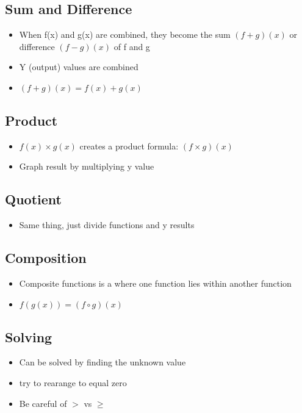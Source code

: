 \documentclass{article}
\begin{document}
    \subsection{Sum and Difference}
    \begin{itemize}
        \item When f(x) and g(x) are combined, they become the sum $(f+g)(x)$ or difference $(f-g)(x)$ of f and g
        \item Y (output) values are combined
        \item $(f + g)(x) = f(x) + g(x)$
    \end{itemize}

    \subsection{Product}
    \begin{itemize}
        \item $f(x) \times g(x)$ creates a product formula: $(f\times g)(x)$
        \item Graph result by multiplying y value
    \end{itemize}

    \subsection{Quotient}
    \begin{itemize}
        \item Same thing, just divide functions and y results
    \end{itemize}

    \subsection{Composition}
    \begin{itemize}
        \item Composite functions is a where one function lies within another function
        \item $f(g(x)) = (f\circ g)(x)$
    \end{itemize}

    \subsection{Solving}
    \begin{itemize}
        \item Can be solved by finding the unknown value
        \item try to rearange to equal zero
        \item Be careful of $>$ vs $\geq$
    \end{itemize}
\end{document}
